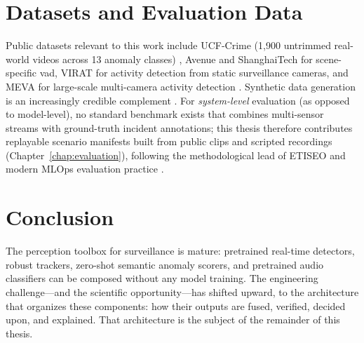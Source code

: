 \section{Datasets and Evaluation Data}

Public datasets relevant to this work include UCF-Crime (1{,}900 untrimmed real-world videos across 13 anomaly classes) \cite{sultani2018ucfcrime}, Avenue and ShanghaiTech for scene-specific \gls{vad}, VIRAT for activity detection from static surveillance cameras, and MEVA for large-scale multi-camera activity detection \cite{tan2025how}. Synthetic data generation is an increasingly credible complement \cite{delussu2024synthetic, riaz2023synthetic, chu2025lfsyngen}. For \emph{system-level} evaluation (as opposed to model-level), no standard benchmark exists that combines multi-sensor streams with ground-truth incident annotations; this thesis therefore contributes replayable scenario manifests built from public clips and scripted recordings (Chapter~\ref{chap:evaluation}), following the methodological lead of ETISEO \cite{nghiem2007etiseo} and modern MLOps evaluation practice \cite{aicity2025}.

\section{Conclusion}

The perception toolbox for surveillance is mature: pretrained real-time detectors, robust trackers, zero-shot semantic anomaly scorers, and pretrained audio classifiers can be composed without any model training. The engineering challenge---and the scientific opportunity---has shifted upward, to the architecture that organizes these components: how their outputs are fused, verified, decided upon, and explained. That architecture is the subject of the remainder of this thesis.
